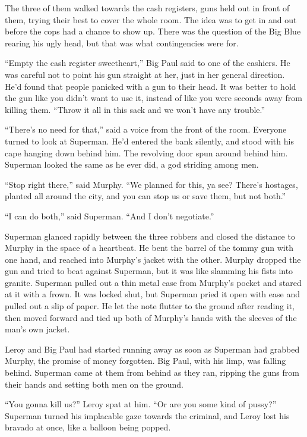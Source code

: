 \documentclass[ebook,12pt]{memoir}
\begin{document}
The three of them walked towards the cash registers, guns held out in
front of them, trying their best to cover the whole room. The idea was
to get in and out before the cops had a chance to show up. There was the
question of the Big Blue rearing his ugly head, but that was what
contingencies were for.

``Empty the cash register sweetheart,'' Big Paul said to one of the
cashiers. He was careful not to point his gun straight at her, just in
her general direction. He'd found that people panicked with a gun to
their head. It was better to hold the gun like you didn't want to use
it, instead of like you were seconds away from killing them. ``Throw it
all in this sack and we won't have any trouble.''

``There's no need for that,'' said a voice from the front of the room.
Everyone turned to look at Superman. He'd entered the bank silently, and
stood with his cape hanging down behind him. The revolving door spun
around behind him. Superman looked the same as he ever did, a god
striding among men.

``Stop right there,'' said Murphy. ``We planned for this, ya see?
There's hostages, planted all around the city, and you can stop us or
save them, but not both.''

``I can do both,'' said Superman. ``And I don't negotiate.''

Superman glanced rapidly between the three robbers and closed the
distance to Murphy in the space of a heartbeat. He bent the barrel of
the tommy gun with one hand, and reached into Murphy's jacket with the
other. Murphy dropped the gun and tried to beat against Superman, but it
was like slamming his fists into granite. Superman pulled out a thin
metal case from Murphy's pocket and stared at it with a frown. It was
locked shut, but Superman pried it open with ease and pulled out a slip
of paper. He let the note flutter to the ground after reading it, then
moved forward and tied up both of Murphy's hands with the sleeves of the
man's own jacket.

Leroy and Big Paul had started running away as soon as Superman had
grabbed Murphy, the promise of money forgotten. Big Paul, with his limp,
was falling behind. Superman came at them from behind as they ran,
ripping the guns from their hands and setting both men on the ground.

``You gonna kill us?'' Leroy spat at him. ``Or are you some kind of
pussy?'' Superman turned his implacable gaze towards the criminal, and
Leroy lost his bravado at once, like a balloon being popped.
\end{document}
